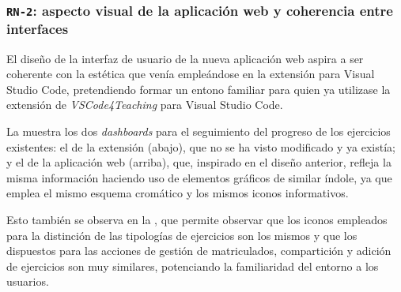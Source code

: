 \subsubsection{\texttt{RN-2}: aspecto visual de la aplicación web y coherencia entre interfaces}
\label{subsec:rn2}

El diseño de la interfaz de usuario de la nueva aplicación web aspira a ser coherente con la estética que venía empleándose en la extensión para Visual Studio Code, pretendiendo formar un entono familiar para quien ya utilizase la extensión de \textit{VSCode4Teaching} para Visual Studio Code.

La  muestra los dos \textit{dashboards} para el seguimiento del progreso de los ejercicios existentes: el de la extensión (abajo), que no se ha visto modificado y ya existía; y el de la aplicación web (arriba), que, inspirado en el diseño anterior, refleja la misma información haciendo uso de elementos gráficos de similar índole, ya que emplea el mismo esquema cromático y los mismos iconos informativos.

Esto también se observa en la , que permite observar que los iconos empleados para la distinción de las tipologías de ejercicios son los mismos y que los dispuestos para las acciones de gestión de matriculados, compartición y adición de ejercicios son muy similares, potenciando la familiaridad del entorno a los usuarios.

